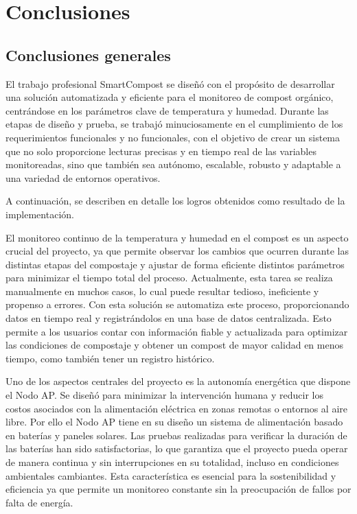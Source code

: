 
\chapter{Conclusiones} %

\label{ChapterConclusiones} 




\section{Conclusiones generales }

El trabajo profesional SmartCompost se diseñó con el propósito de desarrollar una solución automatizada y eficiente para el monitoreo de compost orgánico, centrándose en los parámetros clave de temperatura y humedad. Durante las etapas de diseño y prueba, se trabajó minuciosamente en el cumplimiento de los requerimientos funcionales y no funcionales, con el objetivo de crear un sistema que no solo proporcione lecturas precisas y en tiempo real de las variables monitoreadas, sino que también sea autónomo, escalable, robusto y adaptable a una variedad de entornos operativos.

A continuación, se describen en detalle los logros obtenidos como resultado de la implementación.

El monitoreo continuo de la temperatura y humedad en el compost es un aspecto crucial del proyecto, ya que permite observar los cambios que ocurren durante las distintas etapas del compostaje y ajustar de forma eficiente distintos parámetros para minimizar el tiempo total del proceso. 
Actualmente, esta tarea se realiza manualmente en muchos casos, lo cual puede resultar tedioso, ineficiente y propenso a errores. Con esta solución se automatiza este proceso, proporcionando datos en tiempo real y registrándolos en una base de datos centralizada. Esto permite a los usuarios contar con información fiable y actualizada para optimizar las condiciones de compostaje y obtener un compost de mayor calidad en menos tiempo, como también tener un registro histórico.

Uno de los aspectos centrales del proyecto es la autonomía energética que dispone el Nodo AP. Se diseñó para minimizar la intervención humana y reducir los costos asociados con la alimentación eléctrica en zonas remotas o entornos al aire libre. Por ello el Nodo AP tiene en su diseño un sistema de alimentación basado en baterías y paneles solares. Las pruebas realizadas para verificar la duración de las baterías han sido satisfactorias, lo que garantiza que el proyecto pueda operar de manera continua y sin interrupciones en su totalidad, incluso en condiciones ambientales cambiantes. Esta característica es esencial para la sostenibilidad y eficiencia ya que permite un monitoreo constante sin la preocupación de fallos por falta de energía.

